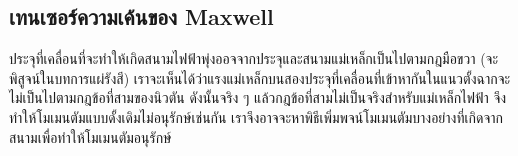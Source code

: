 \subsection{เทนเซอร์ความเค้นของ Maxwell}

ประจุที่เคลื่อนที่จะทำให้เกิดสนามไฟฟ้าพุ่งออจจากประจุและสนามแม่เหล็กเป็นไปตามกฎมือขวา (จะพิสูจน์ในบทการแผ่รังสี) เราจะเห็นได้ว่าแรงแม่เหล็กบนสองประจุที่เคลื่อนที่เข้าหากันในแนวตั้งฉากจะไม่เป็นไปตามกฎข้อที่สามของนิวตัน ดังนั้นจริง ๆ แล้วกฎข้อที่สามไม่เป็นจริงสำหรับแม่เหล็กไฟฟ้า จึงทำให้โมเมนตัมแบบดั้งเดิมไม่อนุรักษ์เช่นกัน เราจึงอาจจะหาพิธีเพิ่มพจน์โมเมนตัมบางอย่างที่เกิดจากสนามเพื่อทำให้โมเมนตัมอนุรักษ์


